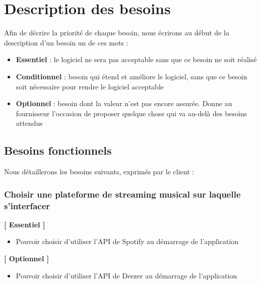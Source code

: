 \documentclass{article}
\begin{document}
		\section{Description des besoins} \label{besoins}
		Afin de décrire la priorité de chaque besoin, nous écrirons au début de la description d'un besoin un de ces mots :
		\begin{itemize}
			\item \textbf{Essentiel} : le logiciel ne sera pas acceptable sans que ce besoin ne soit réalisé
			\item \textbf{Conditionnel} : besoin qui étend et améliore le logiciel, sans que ce besoin soit nécessaire pour rendre le logiciel acceptable
			\item \textbf{Optionnel} : besoin dont la valeur n’est pas encore assurée. Donne au fournisseur l’occasion de proposer quelque chose qui va au-delà des besoins attendus
		\end{itemize}
		
		\subsection{Besoins fonctionnels}
		Nous détaillerons les besoins suivants, exprimés par le client :
		
		\subsubsection{Choisir une plateforme de streaming musical sur laquelle s'interfacer}
		\textbf{[ Essentiel ]}
		\begin{itemize}
			\item Pouvoir choisir d'utiliser l'API de Spotify au démarrage de l'application
		\end{itemize}
		\textbf{[ Optionnel ]}
		\begin{itemize}
			\item Pouvoir choisir d'utiliser l'API de Deezer au démarrage de l'application
		\end{itemize}
\end{document}
